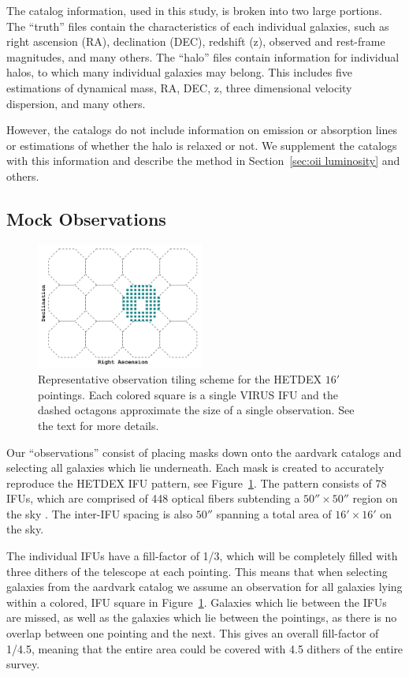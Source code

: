 \documentclass[apj, revtex4]{emulateapj}
\begin{document}
The catalog information, used in this study, is broken into two large portions. The ``truth'' files contain the characteristics of each individual galaxies, such as right ascension (RA), declination (DEC), redshift (z), observed and rest-frame magnitudes, and many others. The ``halo'' files contain information for individual halos, to which many individual galaxies may belong. This includes five estimations of dynamical mass, RA, DEC, z, three dimensional velocity dispersion, and many others.

However, the catalogs do not include information on emission or absorption lines or estimations of whether the halo is relaxed or not. We supplement the catalogs with this information and describe the method in Section~\ref{sec:oii luminosity} and others. 

\subsection{Mock Observations}
\begin{figure} 
	\includegraphics[width=0.49\textwidth]{f01.pdf} 
	\caption{Representative observation tiling scheme for the HETDEX $16'$ pointings. Each colored square is a single VIRUS IFU and the dashed octagons approximate the size of a single observation. See the text for more details.} \label{fig:ifu layout} 
\end{figure}

Our ``observations'' consist of placing masks down onto the aardvark catalogs and selecting all galaxies which lie underneath. Each mask is created to accurately reproduce the HETDEX IFU pattern, see Figure~\ref{fig:ifu layout}. The pattern consists of 78 IFUs, which are comprised of 448 optical fibers subtending a $50'' \times 50''$ region on the sky \citep{Kelz2014}. The inter-IFU spacing is also $50''$ spanning a total area of $16'\times 16'$ on the sky. 

The individual IFUs have a fill-factor of 1/3, which will be completely filled with three dithers of the telescope at each pointing. This means that when selecting galaxies from the aardvark catalog we assume an observation for all galaxies lying within a colored, IFU square in Figure~\ref{fig:ifu layout}. Galaxies which lie between the IFUs are missed, as well as the galaxies which lie between the pointings, as there is no overlap between one pointing and the next. This gives an overall fill-factor of 1/4.5, meaning that the entire area could be covered with 4.5 dithers of the entire survey.
\end{document}
